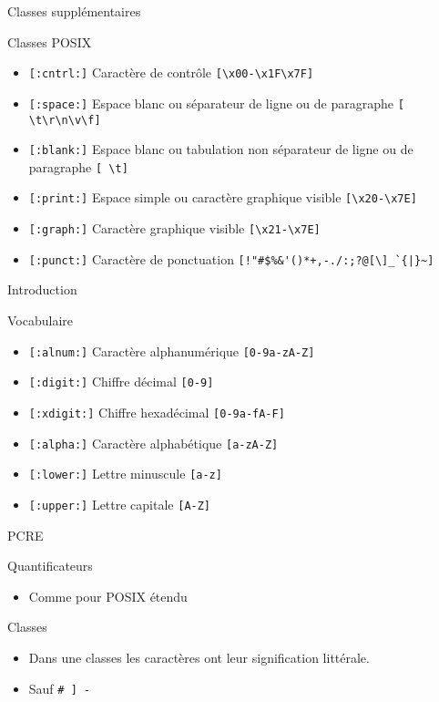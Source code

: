 \def\ftitle{Classes supplémentaires}
\begin{frame}[containsverbatim]{\ftitle}
\def\blocktitle{Classes POSIX}
\begin{block}{\blocktitle}
\begin{itemize}
\item \verb![:cntrl:]! 	Caractère de contrôle 	\verb![\x00-\x1F\x7F]!
\item \verb![:space:]! 	Espace blanc ou séparateur de ligne ou de paragraphe 	\verb![ \t\r\n\v\f]!
\item \verb![:blank:]! 	Espace blanc ou tabulation non séparateur de ligne ou de paragraphe 	\verb![ \t]!
\item \verb![:print:]! 	Espace simple ou caractère graphique visible 	\verb![\x20-\x7E]!
\item \verb![:graph:]! 	Caractère graphique visible 	\verb![\x21-\x7E]!
\item \verb![:punct:]! 	Caractère de ponctuation 	\verb<[!"#$%&'()*+,-./:;?@[\]_`{|}~]<
\end{itemize}
\end{block}
\end{frame}

\def\ftitle{Introduction}
\begin{frame}[containsverbatim]{\ftitle}
\def\blocktitle{Vocabulaire}
\begin{block}{\blocktitle}
\begin{itemize}
\item \verb![:alnum:]! 	Caractère alphanumérique 	\verb![0-9a-zA-Z]!
\item \verb![:digit:]! 	Chiffre décimal 	\verb![0-9]!
\item \verb![:xdigit:]! 	Chiffre hexadécimal 	\verb![0-9a-fA-F]!
\item \verb![:alpha:]! 	Caractère alphabétique 	\verb![a-zA-Z]!
\item \verb![:lower:]! 	Lettre minuscule 	\verb![a-z]!
\item \verb![:upper:]! 	Lettre capitale 	\verb![A-Z]!
\end{itemize}
\end{block}
\end{frame}

\def\ftitle{PCRE}
\begin{frame}[containsverbatim]{\ftitle}
\def\blocktitle{Quantificateurs}
\begin{block}{\blocktitle}
\begin{itemize}
\item Comme pour POSIX étendu
\end{itemize}
\end{block}

\def\blocktitle{Classes}
\begin{block}{\blocktitle}
\begin{itemize}
\item Dans une classes les caractères ont leur signification littérale.
\item Sauf \verb!# ] -!
\end{itemize}
\end{block}
\end{frame}


